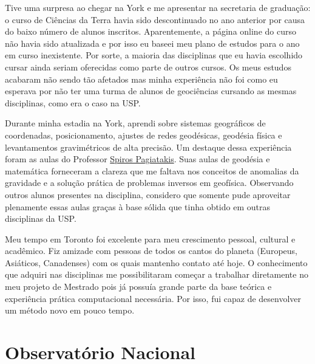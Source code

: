 \documentclass[10pt,a4paper,oneside]{book}
\begin{document}
Tive uma surpresa ao chegar na York e me apresentar na secretaria de graduação:
o curso de Ciências da Terra havia sido descontinuado no ano anterior por causa
do baixo número de alunos inscritos.
Aparentemente, a página online do curso não havia sido atualizada e por isso
eu baseei meu plano de estudos para o ano em curso inexistente.
Por sorte, a maioria das disciplinas que eu havia escolhido cursar ainda
seriam oferecidas como parte de outros cursos.
Os meus estudos acabaram não sendo tão afetados mas minha experiência não foi
como eu esperava por não ter uma turma de alunos de geociências cursando as
mesmas disciplinas, como era o caso na USP.

Durante minha estadia na York, aprendi sobre sistemas geográficos de
coordenadas, posicionamento, ajustes de redes geodésicas, geodésia física e
levantamentos gravimétricos de alta precisão.
Um destaque dessa experiência foram as aulas do Professor
\href{https://www.yorku.ca/spiros/spiros.html}{Spiros Pagiatakis}.
Suas aulas de geodésia e matemática forneceram a clareza que me faltava nos
conceitos de anomalias da gravidade e a solução prática de problemas inversos
em geofísica.
Observando outros alunos presentes na disciplina, considero que somente pude
aproveitar plenamente essas aulas graças à base sólida que tinha obtido em
outras disciplinas da USP.

Meu tempo em Toronto foi excelente para meu crescimento pessoal, cultural e
acadêmico.
Fiz amizade com pessoas de todos os cantos do planeta (Europeus, Asiáticos,
Canadenses) com os quais mantenho contato até hoje.
O conhecimento que adquiri nas disciplinas me possibilitaram começar a
trabalhar diretamente no meu projeto de Mestrado pois já possuía grande parte
da base teórica e experiência prática computacional necessária.
Por isso, fui capaz de desenvolver um método novo em pouco tempo.

\section{Observatório Nacional}
\label{sec_on}
\end{document}
